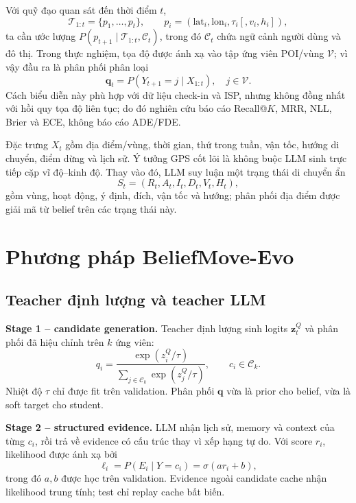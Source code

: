 \documentclass[runningheads]{llncs}
\newcommand{\vect}[1]{\boldsymbol{#1}}
\newcommand{\method}{BeliefMove-Evo}
\begin{document}
Với quỹ đạo quan sát đến thời điểm $t$,
\begin{equation}
 \mathcal{T}_{1:t}=\{p_1,\ldots,p_t\},\qquad
 p_i=(\mathrm{lat}_i,\mathrm{lon}_i,\tau_i[,v_i,h_i]),
\end{equation}
ta cần ước lượng $P(p_{t+1}\mid\mathcal{T}_{1:t},\mathcal{C}_t)$, trong đó $\mathcal{C}_t$ chứa ngữ cảnh người dùng và đô thị. Trong thực nghiệm, tọa độ được ánh xạ vào tập ứng viên POI/vùng $\mathcal{V}$; vì vậy đầu ra là phân phối phân loại
\begin{equation}
 \vect{q}_t=P(Y_{t+1}=j\mid X_{1:t}),\quad j\in\mathcal{V}.
\end{equation}
Cách biểu diễn này phù hợp với dữ liệu check-in và ISP, nhưng không đồng nhất với hồi quy tọa độ liên tục; do đó nghiên cứu báo cáo Recall@$K$, MRR, NLL, Brier và ECE, không báo cáo ADE/FDE.

Đặc trưng $X_t$ gồm địa điểm/vùng, thời gian, thứ trong tuần, vận tốc, hướng di chuyển, điểm dừng và lịch sử. Ý tưởng GPS cốt lõi là không buộc LLM sinh trực tiếp cặp vĩ độ--kinh độ. Thay vào đó, LLM suy luận một trạng thái di chuyển ẩn
\begin{equation}
 S_t=(R_t,A_t,I_t,D_t,V_t,H_t),
\end{equation}
gồm vùng, hoạt động, ý định, đích, vận tốc và hướng; phân phối địa điểm được giải mã từ belief trên các trạng thái này.

\section{Phương pháp \method}

\subsection{Teacher định lượng và teacher LLM}

\textbf{Stage 1 -- candidate generation.} Teacher định lượng sinh logits $\vect{z}^{Q}_t$ và phân phối đã hiệu chỉnh trên $k$ ứng viên:
\begin{equation}
 q_i=\frac{\exp(z_i^Q/\tau)}{\sum_{j\in\mathcal{C}_k}\exp(z_j^Q/\tau)},
 \qquad c_i\in\mathcal{C}_k.
\end{equation}
Nhiệt độ $\tau$ chỉ được fit trên validation. Phân phối $\vect{q}$ vừa là prior cho belief, vừa là soft target cho student.

\textbf{Stage 2 -- structured evidence.} LLM nhận lịch sử, memory và context của từng $c_i$, rồi trả về evidence có cấu trúc thay vì xếp hạng tự do. Với score $r_i$, likelihood được ánh xạ bởi
\begin{equation}
 \ell_i=P(E_i\mid Y=c_i)=\sigma(a r_i+b),
\end{equation}
trong đó $a,b$ được học trên validation. Evidence ngoài candidate cache nhận likelihood trung tính; test chỉ replay cache bất biến.
\end{document}
